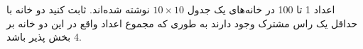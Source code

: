 \p    
اعداد 1 تا 100 در خانه‌های یک جدول 
$10 \times 10$
نوشته شده‌اند. ثابت کنید دو خانه با حداقل یک راس مشترک وجود دارند به طوری که مجموع اعداد واقع در این دو خانه بر 4 بخش پذیر باشد.
